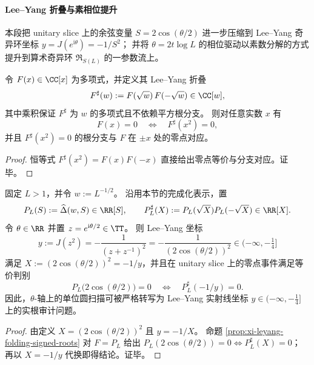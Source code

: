 \paragraph{Lee--Yang 折叠与素相位提升}
本段把 unitary slice 上的余弦变量 \(S=2\cos(\theta/2)\) 进一步压缩到 Lee--Yang 奇异环坐标 \(y=J(e^{\mathrm{i}\theta})=-1/S^2\)；
并将 \(\theta=2t\log L\) 的相位驱动以素数分解的方式提升到算术奇异环 \(\mathfrak{R}_{S(L)}\) 的一参数流上。

\begin{proposition}\label{prop:xi-leyang-folding-signed-roots}
令 \(F(x)\in\CC[x]\) 为多项式，并定义其 Lee--Yang 折叠
\[
F^{\sharp}(w):=F(\sqrt{w})\,F(-\sqrt{w})\in\CC[w],
\]
其中乘积保证 \(F^{\sharp}\) 为 \(w\) 的多项式且不依赖平方根分支。
则对任意实数 \(x\) 有
\[
F(x)=0\quad\Longleftrightarrow\quad F^{\sharp}(x^2)=0,
\]
并且 \(F^{\sharp}(x^2)=0\) 的根分支与 \(F\) 在 \(\pm x\) 处的零点对应。
\end{proposition}
\begin{proof}
恒等式 \(F^{\sharp}(x^2)=F(x)F(-x)\) 直接给出零点等价与分支对应。证毕。
\end{proof}

\begin{proposition}[单位圆扫描到奇异环扫描的代数折叠]\label{prop:xi-unitary-slice-leyang-folded-scan}
固定 \(L>1\)，并令 \(w:=L^{-1/2}\)。
沿用本节的完成化表示，置
\[
P_L(S):=\widehat\Delta(w,S)\in\RR[S],
\qquad
P_L^{\sharp}(X):=P_L(\sqrt{X})P_L(-\sqrt{X})\in\RR[X].
\]
令 \(\theta\in\RR\) 并置 \(z=e^{\mathrm{i}\theta/2}\in\TT\)。
则 Lee--Yang 坐标
\[
y:=J(z^2)=-\frac{1}{(z+z^{-1})^2}=-\frac{1}{(2\cos(\theta/2))^2}\in(-\infty,-\tfrac14]
\]
满足 \(X:=(2\cos(\theta/2))^2=-1/y\)，并且在 unitary slice 上的零点事件满足等价判别
\[
P_L\!\bigl(2\cos(\theta/2)\bigr)=0
\quad\Longleftrightarrow\quad
P_L^{\sharp}(-1/y)=0.
\]
因此，\(\theta\)-轴上的单位圆扫描可被严格转写为 Lee--Yang 实射线坐标 \(y\in(-\infty,-\tfrac14]\) 上的实根审计问题。
\end{proposition}
\begin{proof}
由定义 \(X=(2\cos(\theta/2))^2\) 且 \(y=-1/X\)。
命题 \ref{prop:xi-leyang-folding-signed-roots} 对 \(F=P_L\) 给出
\(
P_L(2\cos(\theta/2))=0\iff P_L^{\sharp}(X)=0
\)；
再以 \(X=-1/y\) 代换即得结论。证毕。
\end{proof}

